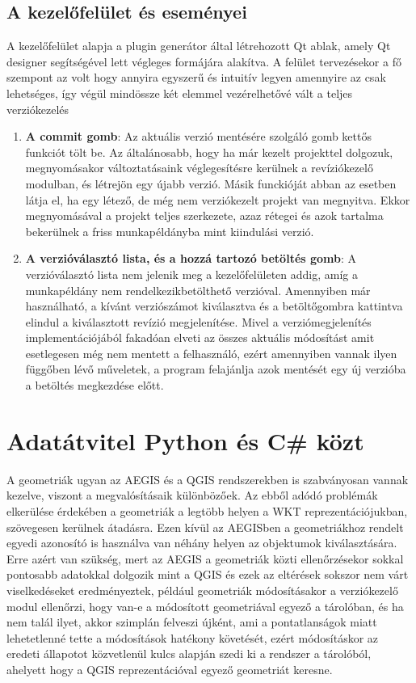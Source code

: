 \subsection{A kezelőfelület és eseményei}
A kezelőfelület alapja a plugin generátor által létrehozott Qt ablak, amely Qt designer segítségével lett végleges formájára alakítva. A felület tervezésekor a fő szempont az volt hogy annyira egyszerű és intuitív legyen amennyire az csak lehetséges, így végül mindössze két elemmel vezérelhetővé vált a teljes verziókezelés
\begin{enumerate}
	\item \textbf{A commit gomb}: Az aktuális verzió mentésére szolgáló gomb kettős funkciót tölt be. Az általánosabb, hogy ha már kezelt projekttel dolgozuk, megnyomásakor változtatásaink véglegesítésre kerülnek a revíziókezelő modulban, és létrejön egy újabb verzió. Másik funckióját abban az esetben látja el, ha egy létező, de még nem verziókezelt projekt van megnyitva. Ekkor megnyomásával a projekt teljes szerkezete, azaz rétegei és azok tartalma bekerülnek a friss munkapéldányba mint kiindulási verzió.
	\item \textbf{A verzióválasztó lista, és a hozzá tartozó betöltés gomb}: A verzióválasztó lista nem jelenik meg a kezelőfelületen addig, amíg a munkapéldány nem rendelkezikbetölthető verzióval. Amennyiben már használható, a kívánt verziószámot kiválasztva és a betöltőgombra kattintva elindul a kiválasztott revízió megjelenítése. Mivel a verziómegjelenítés implementációjából fakadóan elveti az összes aktuális módosítást amit esetlegesen még nem mentett a felhasználó, ezért amennyiben vannak ilyen függőben lévő műveletek, a program felajánlja azok mentését egy új verzióba a betöltés megkezdése előtt.
\end{enumerate}

\section{Adatátvitel Python és C\# közt}
A geometriák ugyan az AEGIS és a QGIS rendszerekben is szabványosan vannak kezelve, viszont a megvalósításaik különbözőek. Az ebből adódó problémák elkerülése érdekében a geometriák a legtöbb helyen a WKT reprezentációjukban, szövegesen kerülnek átadásra. Ezen kívül az AEGISben a geometriákhoz rendelt egyedi azonosító is használva van néhány helyen az objektumok kiválasztására. Erre azért van szükség, mert az AEGIS a geometriák közti ellenőrzésekor sokkal pontosabb adatokkal dolgozik mint a QGIS és ezek az eltérések sokszor nem várt viselkedéseket eredményeztek, például geometriák módosításakor a verziókezelő modul ellenőrzi, hogy van-e a módosított geometriával egyező a tárolóban, és ha nem talál ilyet, akkor szimplán felveszi újként, ami a pontatlanságok miatt lehetetlenné tette a módosítások hatékony követését, ezért módosításkor az eredeti állapotot közvetlenül kulcs alapján szedi ki a rendszer a tárolóból, ahelyett hogy a QGIS reprezentációval egyező geometriát keresne.


